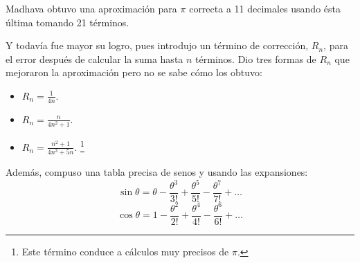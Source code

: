 \documentclass[a4paper, 11pt]{article}
\begin{document}
		Madhava obtuvo una aproximación para $\pi$ correcta a 11 decimales usando ésta última tomando 21 términos.
		
		Y todavía fue mayor su logro, pues introdujo un término de corrección, $R_n$, para el error después de calcular
		la suma hasta $n$ términos. Dio tres formas de $R_n$ que mejoraron la aproximación pero no se sabe cómo los
		obtuvo:
		\begin{itemize}
			\item $R_n = \frac{1}{4n}$.
			\item $R_n = \frac{n}{4n^2 + 1}$.
			\item $R_n = \frac{n^2 + 1}{4n^3 + 5n}$. \footnote{Este término conduce a cálculos muy precisos de $\pi$.}
		\end{itemize}
		
		Además, compuso una tabla precisa de senos y usando las expansiones:
		$$\sin \theta = \theta - \frac{\theta^3}{3!} + \frac{\theta^5}{5!} - \frac{\theta^7}{7!} + \dots $$
		$$\cos \theta = 1 - \frac{\theta^2}{2!} + \frac{\theta^4}{4!} - \frac{\theta^6}{6!} + \dots $$
		
\newpage
{}

\end{document}
